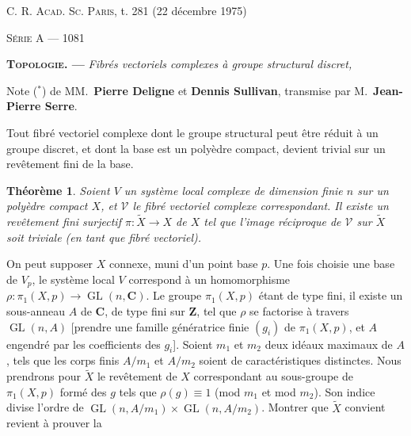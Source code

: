 \documentclass[10pt]{amsart}
\theoremstyle{plain}
\newtheorem*{theoreme}{Th\'{e}or\`{e}me}
\theoremstyle{remark}
\begin{document}
\noindent\begin{minipage}[t]{0.5\textwidth}
\textsc{C. R. Acad. Sc. Paris}, t. 281 (22 d\'{e}cembre 1975)
\end{minipage}%
\begin{minipage}[t]{0.5\textwidth}
\raggedleft
\textsc{S\'{e}rie A} --- 1081
\end{minipage}

\vspace{0.5\baselineskip}

\noindent\textbf{\textsc{Topologie}. ---} \textit{Fibr\'{e}s vectoriels complexes \`{a} groupe structural discret,}

\smallskip
\noindent Note ($^*$) de MM.\ \textbf{Pierre Deligne} et \textbf{Dennis Sullivan}, transmise par M.\ \textbf{Jean-Pierre Serre}.

\bigskip

Tout fibr\'{e} vectoriel complexe dont le groupe structural peut \^{e}tre r\'{e}duit \`{a} un groupe discret, et dont la base est un poly\`{e}dre compact, devient trivial sur un rev\^{e}tement fini de la base.

\begin{theoreme}
Soient $V$ un syst\`{e}me local complexe de dimension finie $n$ sur un poly\`{e}dre compact $X$, et $\mathscr{V}$ le fibr\'{e} vectoriel complexe correspondant. Il existe un rev\^{e}tement fini surjectif $\pi:\widetilde{X}\to X$ de $X$ tel que l'image r\'{e}ciproque de $\mathscr{V}$ sur $\widetilde{X}$ soit triviale (en tant que fibr\'{e} vectoriel).
\end{theoreme}

On peut supposer $X$ connexe, muni d'un point base $p$. Une fois choisie une base de $V_p$, le syst\`{e}me local $V$ correspond \`{a} un homomorphisme $\rho:\pi_1(X,p)\to\operatorname{GL}(n,\mathbf{C})$. Le groupe $\pi_1(X,p)$ \'{e}tant de type fini, il existe un sous-anneau $A$ de $\mathbf{C}$, de type fini sur $\mathbf{Z}$, tel que $\rho$ se factorise \`{a} travers $\operatorname{GL}(n,A)$ [prendre une famille g\'{e}n\'{e}ratrice finie $(g_i)$ de $\pi_1(X,p)$, et $A$ engendr\'{e} par les coefficients des $g_i$]. Soient $m_1$ et $m_2$ deux id\'{e}aux maximaux de $A$, tels que les corps finis $A/m_1$ et $A/m_2$ soient de caract\'{e}ristiques distinctes. Nous prendrons pour $\widetilde{X}$ le rev\^{e}tement de $X$ correspondant au sous-groupe de $\pi_1(X,p)$ form\'{e} des $g$ tels que $\rho(g)\equiv1$ (mod $m_1$ et mod $m_2$). Son indice divise l'ordre de $\operatorname{GL}(n,A/m_1)\times\operatorname{GL}(n,A/m_2)$. Montrer que $\widetilde{X}$ convient revient \`{a} prouver la
\end{document}
